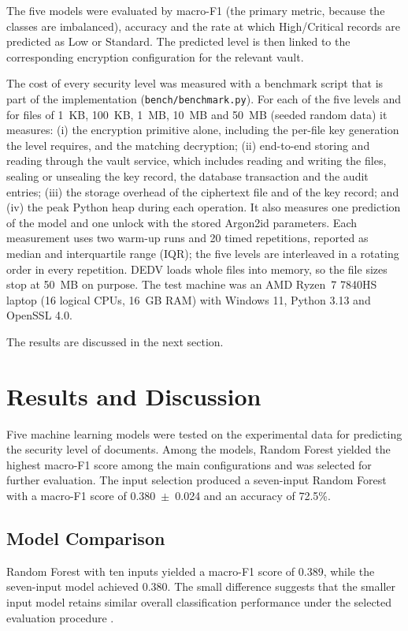 \documentclass[pdflatex,sn-mathphys-num]{sn-jnl}
\newcommand{\code}[1]{\texttt{#1}}
\begin{document}
The five models were evaluated by macro-F1 (the primary metric, because the classes are
imbalanced), accuracy and the rate at which High/Critical records are predicted as Low or
Standard. The predicted level is then linked to the corresponding encryption configuration for the
relevant vault.

The cost of every security level was measured with a benchmark script that is part of the
implementation (\code{bench/benchmark.py}). For each of the five levels and for files of 1~KB,
100~KB, 1~MB, 10~MB and 50~MB (seeded random data) it measures: (i) the encryption primitive
alone, including the per-file key generation the level requires, and the matching decryption;
(ii) end-to-end storing and reading through the vault service, which includes reading and writing
the files, sealing or unsealing the key record, the database transaction and the audit entries;
(iii) the storage overhead of the ciphertext file and of the key record; and (iv) the peak Python
heap during each operation. It also measures one prediction of the model and one unlock with the
stored Argon2id parameters. Each measurement uses two warm-up runs and 20 timed repetitions,
reported as median and interquartile range (IQR); the five levels are interleaved in a rotating
order in every repetition. DEDV loads whole files into memory, so the file sizes stop at 50~MB on
purpose. The test machine was an AMD Ryzen~7 7840HS laptop (16 logical CPUs, 16~GB RAM) with
Windows 11, Python 3.13 and OpenSSL 4.0.

The results are discussed in the next section.

\section{Results and Discussion}\label{sec8}

Five machine learning models were tested on the experimental data for predicting the security
level of documents. Among the models, Random Forest yielded the highest macro-F1 score among the
main configurations and was selected for further evaluation. The input selection produced a
seven-input Random Forest with a macro-F1 score of 0.380~$\pm$~0.024 and an accuracy of 72.5\%.

\subsection{Model Comparison}\label{sec8-1}

Random Forest with ten inputs yielded a macro-F1 score of 0.389, while the seven-input model
achieved 0.380. The small difference suggests that the smaller input model retains similar overall
classification performance under the selected evaluation procedure \cite{theng2024feature}.
\end{document}
